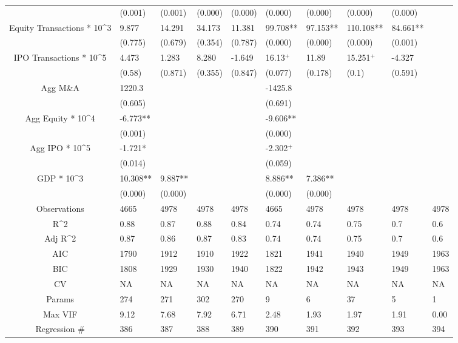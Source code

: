 \documentclass{article}
\begin{document}
\begin{table}[H]
\begin{tabular}{|clllllllll|}
   & (0.001) & (0.001) & (0.000) & (0.000) & (0.000) & (0.000) & (0.000) & (0.000) &  \\ 
  Equity Transactions * 10^3 & 9.877 & 14.291 & 34.173 & 11.381 & 99.708** & 97.153** & 110.108** & 84.661** &  \\ 
   & (0.775) & (0.679) & (0.354) & (0.787) & (0.000) & (0.000) & (0.000) & (0.001) &  \\ 
  IPO Transactions * 10^5 & 4.473 & 1.283 & 8.280 & -1.649 & 16.13$^{+}$ & 11.89 & 15.251$^{+}$ & -4.327 &  \\ 
   & (0.58) & (0.871) & (0.355) & (0.847) & (0.077) & (0.178) & (0.1) & (0.591) &  \\ 
  Agg M\&A & 1220.3 &  &  &  & -1425.8 &  &  &  &  \\ 
   & (0.605) &  &  &  & (0.691) &  &  &  &  \\ 
  Agg Equity * 10^4 & -6.773** &  &  &  & -9.606** &  &  &  &  \\ 
   & (0.001) &  &  &  & (0.000) &  &  &  &  \\ 
  Agg IPO * 10^5 & -1.721* &  &  &  & -2.302$^{+}$ &  &  &  &  \\ 
   & (0.014) &  &  &  & (0.059) &  &  &  &  \\ 
  GDP * 10^3 & 10.308** & 9.887** &  &  & 8.886** & 7.386** &  &  &  \\ 
   & (0.000) & (0.000) &  &  & (0.000) & (0.000) &  &  &  \\ 
  \hline 
 Observations & 4665 & 4978 & 4978 & 4978 & 4665 & 4978 & 4978 & 4978 & 4978 \\ 
  R^2 & 0.88 & 0.87 & 0.88 & 0.84 & 0.74 & 0.74 & 0.75 & 0.7 & 0.6 \\ 
  Adj R^2 & 0.87 & 0.86 & 0.87 & 0.83 & 0.74 & 0.74 & 0.75 & 0.7 & 0.6 \\ 
  AIC & 1790 & 1912 & 1910 & 1922 & 1821 & 1941 & 1940 & 1949 & 1963 \\ 
  BIC & 1808 & 1929 & 1930 & 1940 & 1822 & 1942 & 1943 & 1949 & 1963 \\ 
  CV & NA & NA & NA & NA & NA & NA & NA & NA & NA \\ 
  Params & 274 & 271 & 302 & 270 & 9 & 6 & 37 & 5 & 1 \\ 
  Max VIF & 9.12 & 7.68 & 7.92 & 6.71 & 2.48 & 1.93 & 1.97 & 1.91 & 0.00 \\ 
  Regression \# & 386 & 387 & 388 & 389 & 390 & 391 & 392 & 393 & 394 \\ 
   \hline
\end{tabular}
 
\end{table}
\end{document}
